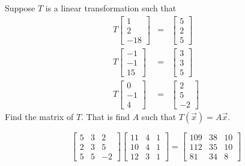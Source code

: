\documentclass{ximera}
\begin{document}
\begin{problem}\label{prb:10.97} Suppose $T$ is a linear transformation such that
\begin{eqnarray*}
T\left[
\begin{array}{r}
1 \\
2 \\
-18
\end{array}
\right] &=&\left[
\begin{array}{r}
5 \\
2 \\
5
\end{array}
\right] \\
T\left[
\begin{array}{r}
-1 \\
-1 \\
15
\end{array}
\right] &=&\left[
\begin{array}{r}
3 \\
3 \\
5
\end{array}
\right] \\
T\left[
\begin{array}{r}
0 \\
-1 \\
4
\end{array}
\right] &=&\left[
\begin{array}{r}
2 \\
5 \\
-2
\end{array}
\right]
\end{eqnarray*}
Find the matrix of $T$. That is find $A$ such that $T(\vec{x})=A\vec{x}$. \vspace{1mm}
\begin{hint}
\[
\left[
\begin{array}{rrr}
5 & 3 & 2 \\
2 & 3 & 5 \\
5 & 5 & -2
\end{array}
\right] \left[
\begin{array}{ccc}
11 & 4 & 1 \\
10 & 4 & 1 \\
12 & 3 & 1
\end{array}
\right] =\left[
\begin{array}{ccc}
109 & 38 & 10 \\
112 & 35 & 10 \\
81 & 34 & 8
\end{array}
\right]
\]
\end{hint}
\end{problem}
\end{document}
